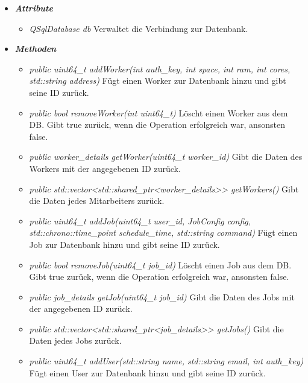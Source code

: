 \documentclass[a4paper,12pt]{article}
\begin{document}
\begin{itemize}[label={}]

	\item \textit{\textbf{Attribute}}
		\begin{itemize}[label={\textbullet}]
			\item \textit{QSqlDatabase db} Verwaltet die Verbindung zur Datenbank. 
		\end{itemize}

	\item \textit{\textbf{Methoden}}
		\begin{itemize}[label={\textbullet}]
			\item \textit{public uint64\_t addWorker(int auth\_key, int space, int ram, int cores, std::string address)} Fügt einen Worker zur Datenbank hinzu und gibt seine ID zurück.
				
				\item \textit{public bool removeWorker(int uint64\_t)} Löscht einen Worker aus dem DB. Gibt true zurück, wenn die Operation erfolgreich war, ansonsten false.
				
				\item \textit{public worker\_details getWorker(uint64\_t worker\_id)} Gibt die Daten des Workers mit der angegebenen ID zurück.
				
				\item \textit{public std::vector<std::shared\_ptr<worker\_details>> getWorkers()} Gibt die Daten jedes Mitarbeiters zurück.
				
				\item \textit{public uint64\_t addJob(uint64\_t user\_id, JobConfig config, std::chrono::time\_point schedule\_time, std::string command)} Fügt einen Job zur Datenbank hinzu und gibt seine ID zurück. 
				
				\item \textit{public bool removeJob(uint64\_t job\_id)} Löscht einen Job aus dem DB. Gibt true zurück, wenn die Operation erfolgreich war, ansonsten false.
				
				\item \textit{public job\_details getJob(uint64\_t job\_id)} Gibt die Daten des Jobs mit der angegebenen ID zurück.
				
				\item \textit{public std::vector<std::shared\_ptr<job\_details>> getJobs()} Gibt die Daten jedes Jobs zurück.
				
				\item \textit{public uint64\_t addUser(std::string name, std::string email, int auth\_key)} Fügt einen User zur Datenbank hinzu und gibt seine ID zurück. 
				

\end{itemize}
\end{itemize}
\end{document}
